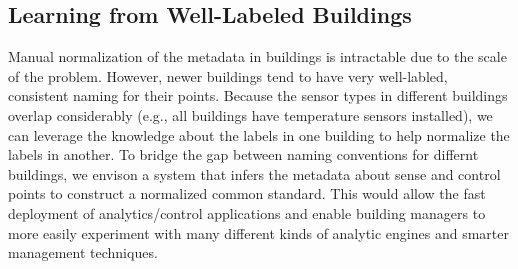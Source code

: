 \subsection{Learning from Well-Labeled Buildings}
Manual normalization of the metadata in buildings is intractable due to 
the scale of the problem. However, newer buildings tend to have very well-labled, consistent
naming for their points.
Because the sensor types in different buildings 
overlap considerably (e.g., all buildings have temperature sensors installed),
we can leverage the knowledge about the labels in one building to 
help normalize the labels in another.
To bridge the gap between naming conventions for differnt buildings, we envison 
a system that infers the metadata about sense and control points to construct a normalized 
common standard.
This would allow the fast deployment of analytics/control applications and enable
building managers to more easily experiment with many different kinds 
of analytic engines and smarter management techniques. 

